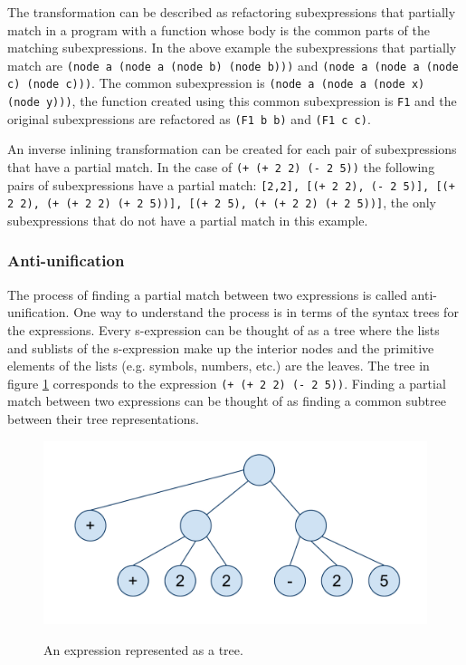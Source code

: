 \documentclass[a4paper,10pt]{article}
\begin{document}
  The transformation can be described as refactoring subexpressions that partially match in a program with a function whose body is the common parts of the matching subexpressions.  In the above example the subexpressions that partially match are \texttt{(node a (node a (node b) (node b)))} and \texttt{(node a (node a (node c) (node c)))}.  The common subexpression is \texttt{(node a (node a (node x) (node y)))}, the function created using this common subexpression is \texttt{F1} and the original subexpressions are refactored as \texttt{(F1 b b)} and \texttt{(F1 c c)}.

An inverse inlining transformation can be created for each pair of subexpressions that have a partial match.  In the case of \texttt{(+ (+ 2 2) (- 2 5))} the following pairs of subexpressions have a partial match: \texttt{[2,2], [(+ 2 2), (- 2 5)], [(+ 2 2), (+ (+ 2 2) (+ 2 5))], [(+ 2 5), (+ (+ 2 2) (+ 2 5))]}, the only subexpressions that do not have a partial match in this example.
\subsubsection{Anti-unification}
The process of finding a partial match between two expressions is called anti-unification.  One way to understand the process is in terms of the syntax trees for the expressions.  Every s-expression can be thought of as a tree where the lists and sublists of the s-expression make up the interior nodes and the primitive elements of the lists (e.g. symbols, numbers, etc.) are the leaves.  The tree in figure \ref{expressionTree} corresponds to the expression \texttt{(+ (+ 2 2) (- 2 5))}.  Finding a partial match between two expressions can be thought of as finding a common subtree between their tree representations.
\begin{figure}
\begin{center}
\includegraphics[scale=.40]{expressionTree.pdf}
\label{expressionTree}
\caption{An expression represented as a tree.}
\end{center}
\end{figure}
\end{document}
